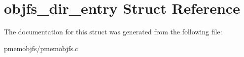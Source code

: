 \hypertarget{structobjfs__dir__entry}{}\section{objfs\+\_\+dir\+\_\+entry Struct Reference}
\label{structobjfs__dir__entry}


The documentation for this struct was generated from the following file\+:\begin{DoxyCompactItemize}
\item 
pmemobjfs/pmemobjfs.\+c\end{DoxyCompactItemize}
